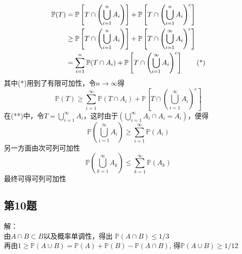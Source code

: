 \documentclass[10pt,a4paper]{article}
\begin{document}


\begin{align}
	\mathbb{P}(T)  
	& = \mathbb{P}\left[ T \cap \left( \bigcup_{i=1}^{n} A_{i} \right) \right] + \mathbb{P}\left[ T \cap \left( \bigcup_{i=1}^{n} A_{i} \right)^\mathrm{c} \right] \notag \\
	& \geq \mathbb{P}\left[ T \cap \left( \bigcup_{i=1}^{n} A_{i} \right) \right] + \mathbb{P}\left[ T \cap \left( \bigcup_{i=1}^{\infty} A_{i} \right)^\mathrm{c} \right] \notag \\
	& = \sum_{i=1}^{n} \mathbb{P}(T \cap A_{i}) + \mathbb{P}\left[ T \cap \left( \bigcup_{i=1}^{\infty} A_{i} \right)^\mathrm{c} \right]	\tag{*}
\end{align}
其中(*)用到了有限可加性，令$n \to \infty$得
\[ \mathbb{P}(T) \geq \sum_{i=1}^{\infty} \mathbb{P}(T \cap A_{i}) + \mathbb{P}\left[ T \cap \left( \bigcup_{i=1}^{\infty} A_{i} \right)^\mathrm{c} \right] \tag{**}\]
在(**)中，令$T=\bigcup_{i=1}^{\infty} A_{i}$，这时由于$ (\bigcup_{i=1}^{\infty} A_{i} \cap A_{i}=A_{i}) $，便得
\[ 
\mathbb{P}(\bigcup_{i=1}^{\infty} A_{i}) \geq \sum_{i=1}^{\infty} \mathbb{P}(A_{i})
\]
另一方面由次可列可加性
\[ \mathbb{P}(\bigcup_{k=1}^{\infty} A_{k}) \leq \sum_{k=1}^{\infty} \mathbb{P}(A_{k}) \]
最终可得可列可加性

\subsection{第10题}
解：\\ 
由$ A \cap B \subset B  $以及概率单调性，得出   $ \mathbb{P}(A \cap B) \leq 1/3 $ \\
再由$ 1 \geq \mathbb{P}(A \cup B)=\mathbb{P}(A) + \mathbb{P}(B) - \mathbb{P}(A \cap B) $, 得$\mathbb{P}(A \cup B) \geq 1/12$
\end{document}
